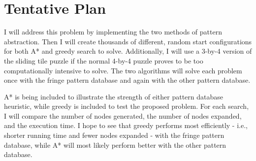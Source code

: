\documentclass[letterpaper,11pt]{article}
\begin{document}
\section{Tentative Plan}

I will address this problem by implementing the two methods of pattern abstraction.  Then I will create thousands of different, random start configurations for both A* and greedy search to solve.  Additionally, I will use a 3-by-4 version of the sliding tile puzzle if the normal 4-by-4 puzzle proves to be too computationally intensive to solve.  The two algorithms will solve each problem once with the fringe pattern database and again with the other pattern database. 

A* is being included to illustrate the strength of either pattern database heuristic, while greedy is included to test the proposed problem.  For each search, I will compare the number of nodes generated, the number of nodes expanded, and the execution time.  I hope to see that greedy performs most efficiently - i.e., shorter running time and fewer nodes expanded - with the fringe pattern database, while A* will most likely perform better with the other pattern database.







\nocite{*} 
\end{document}
